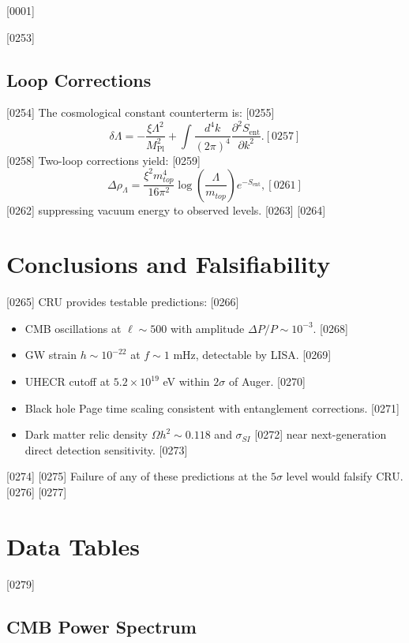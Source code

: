 [0001] \documentclass[12pt]{report}
[0002] \usepackage[utf8]{inputenc}
\begin{document}
[0253] \section{Loop Corrections}
[0254] The cosmological constant counterterm is:
[0255] \begin{equation}
[0256] \delta \Lambda = - \frac{\xi \Lambda^2}{M_{\text{Pl}}^2} 
+ \int \frac{d^4k}{(2\pi)^4} \frac{\partial^2 S_{\text{ent}}}{\partial k^2}.
[0257] \end{equation}
[0258] Two-loop corrections yield:
[0259] \begin{equation}
[0260] \Delta \rho_\Lambda = \frac{\xi^2 m_{top}^4}{16 \pi^2} 
\log\left(\frac{\Lambda}{m_{top}}\right) e^{-S_{\text{ent}}},
[0261] \end{equation}
[0262] suppressing vacuum energy to observed levels.
[0263] 
[0264] \chapter{Conclusions and Falsifiability}
[0265] CRU provides testable predictions:
[0266] \begin{itemize}
[0267]   \item CMB oscillations at $\ell \sim 500$ with amplitude $\Delta P/P \sim 10^{-3}$.
[0268]   \item GW strain $h \sim 10^{-22}$ at $f \sim 1$ mHz, detectable by LISA.
[0269]   \item UHECR cutoff at $5.2 \times 10^{19}$ eV within $2\sigma$ of Auger.
[0270]   \item Black hole Page time scaling consistent with entanglement corrections.
[0271]   \item Dark matter relic density $\Omega h^2 \sim 0.118$ and $\sigma_{SI}$ 
[0272]         near next-generation direct detection sensitivity.
[0273] \end{itemize}
[0274] 
[0275] Failure of any of these predictions at the $5\sigma$ level would falsify CRU.
[0276] 
[0277] \appendix
[0278] \chapter{Data Tables}
[0279] \section{CMB Power Spectrum}
\end{document}
